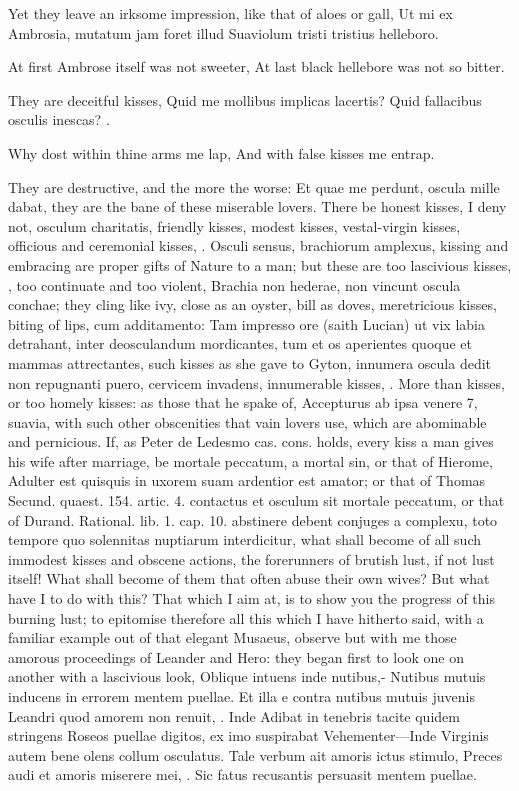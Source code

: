 Yet they leave an irksome impression, like that of aloes or gall,
Ut mi ex Ambrosia, mutatum jam foret illud
Suaviolum tristi tristius helleboro.

At first Ambrose itself was not sweeter,
At last black hellebore was not so bitter.

They are deceitful kisses,
Quid me mollibus implicas lacertis?
Quid fallacibus osculis inescas? \etc{}.

Why dost within thine arms me lap,
And with false kisses me entrap.

They are destructive, and the more the worse: Et quae me perdunt,
oscula mille dabat, they are the bane of these miserable lovers. There
be honest kisses, I deny not, osculum charitatis, friendly kisses,
modest kisses, vestal-virgin kisses, officious and ceremonial kisses,
\etc{}. Osculi sensus, brachiorum amplexus, kissing and embracing are
proper gifts of Nature to a man; but these are too lascivious kisses,
, \etc{} too continuate
and too violent, Brachia non hederae, non vincunt oscula conchae;
they cling like ivy, close as an oyster, bill as doves, meretricious
kisses, biting of lips, cum additamento: Tam impresso ore (saith
Lucian) ut vix labia detrahant, inter deosculandum mordicantes,
tum et os aperientes quoque et mammas attrectantes, \etc{} such kisses as
she gave to Gyton, innumera oscula dedit non repugnanti puero, cervicem
invadens, innumerable kisses, \etc{}. More than kisses, or too homely
kisses: as those that he spake of, Accepturus ab ipsa venere 7,
suavia, \etc{} with such other obscenities that vain lovers use, which are
abominable and pernicious. If, as Peter de Ledesmo cas. cons. holds,
every kiss a man gives his wife after marriage, be mortale peccatum, a
mortal sin, or that of Hierome, Adulter est quisquis in uxorem
suam ardentior est amator; or that of Thomas Secund. quaest. 154.
artic. 4. contactus et osculum sit mortale peccatum, or that of Durand.
Rational. lib. 1. cap. 10. abstinere debent conjuges a complexu, toto
tempore quo solennitas nuptiarum interdicitur, what shall become of all
such immodest kisses and obscene actions, the forerunners of
brutish lust, if not lust itself! What shall become of them that often
abuse their own wives? But what have I to do with this?
That which I aim at, is to show you the progress of this burning lust;
to epitomise therefore all this which I have hitherto said, with a
familiar example out of that elegant Musaeus, observe but with me those
amorous proceedings of Leander and Hero: they began first to look one
on another with a lascivious look,
Oblique intuens inde nutibus,-
Nutibus mutuis inducens in errorem mentem puellae.
Et illa e contra nutibus mutuis juvenis
Leandri quod amorem non renuit, \etc{}. Inde
Adibat in tenebris tacite quidem stringens
Roseos puellae digitos, ex imo suspirabat
Vehementer---Inde
Virginis autem bene olens collum osculatus.
Tale verbum ait amoris ictus stimulo,
Preces audi et amoris miserere mei,  \etc{}.
Sic fatus recusantis persuasit mentem puellae.


